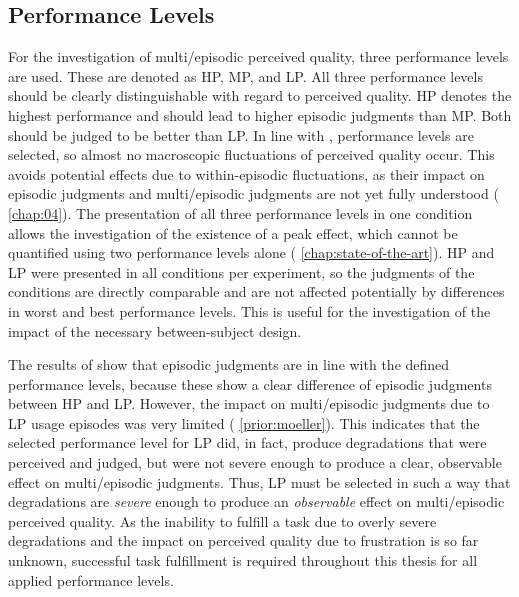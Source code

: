 \subsection{Performance Levels}
For the investigation of multi\-/episodic perceived quality, three performance levels are used.
These are denoted as \acf{HP}, \acf{MP}, and \acf{LP}.
All three performance levels should be clearly distinguishable with regard to perceived quality.
\ac{HP} denotes the highest performance and should lead to higher episodic judgments than \ac{MP}.
Both should be judged to be better than \ac{LP}.
In line with \citet{moller_single-call_2011}, performance levels are selected, so almost no macroscopic fluctuations of perceived quality occur.
This avoids potential effects due to within-episodic fluctuations, as their impact on episodic judgments and multi\-/episodic judgments are not yet fully understood (\cf{} \autoref{chap:04}).
The presentation of all three performance levels in one condition allows the investigation of the existence of a peak effect, which cannot be quantified using two performance levels alone (\cf{} \autoref{chap:state-of-the-art}).
\ac{HP} and \ac{LP} were presented in all conditions per experiment, so the judgments of the conditions are directly comparable and are not affected potentially by differences in worst and best performance levels.
This is useful for the investigation of the impact of the necessary between-subject design.

The results of \citet{moller_single-call_2011} show that episodic judgments are in line with the defined performance levels, because these show a clear difference of episodic judgments between \ac{HP} and \ac{LP}.
However, the impact on multi\-/episodic judgments due to \ac{LP} usage episodes was very limited (\cf{} \autoref{prior:moeller}).
This indicates that the selected performance level for \ac{LP} did, in fact, produce degradations that were perceived and judged, but were not severe enough to produce a clear, observable effect on multi\-/episodic judgments.
Thus, \ac{LP} must be selected in such a way that degradations are \emph{severe} enough to produce an \emph{observable} effect on multi\-/episodic perceived quality.
As the inability to fulfill a task due to overly severe degradations and the impact on perceived quality due to frustration is so far unknown, successful task fulfillment is required throughout this thesis for all applied performance levels.

